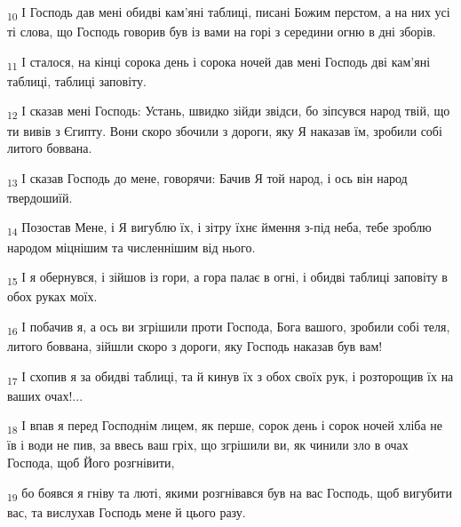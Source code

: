 \begin{tcolorbox}
\textsubscript{10} І Господь дав мені обидві кам'яні таблиці, писані Божим перстом, а на них усі ті слова, що Господь говорив був із вами на горі з середини огню в дні зборів.
\end{tcolorbox}
\begin{tcolorbox}
\textsubscript{11} І сталося, на кінці сорока день і сорока ночей дав мені Господь дві кам'яні таблиці, таблиці заповіту.
\end{tcolorbox}
\begin{tcolorbox}
\textsubscript{12} І сказав мені Господь: Устань, швидко зійди звідси, бо зіпсувся народ твій, що ти вивів з Єгипту. Вони скоро збочили з дороги, яку Я наказав їм, зробили собі литого боввана.
\end{tcolorbox}
\begin{tcolorbox}
\textsubscript{13} І сказав Господь до мене, говорячи: Бачив Я той народ, і ось він народ твердошиїй.
\end{tcolorbox}
\begin{tcolorbox}
\textsubscript{14} Позостав Мене, і Я вигублю їх, і зітру їхнє ймення з-під неба, тебе зроблю народом міцнішим та численнішим від нього.
\end{tcolorbox}
\begin{tcolorbox}
\textsubscript{15} І я обернувся, і зійшов із гори, а гора палає в огні, і обидві таблиці заповіту в обох руках моїх.
\end{tcolorbox}
\begin{tcolorbox}
\textsubscript{16} І побачив я, а ось ви згрішили проти Господа, Бога вашого, зробили собі теля, литого боввана, зійшли скоро з дороги, яку Господь наказав був вам!
\end{tcolorbox}
\begin{tcolorbox}
\textsubscript{17} І схопив я за обидві таблиці, та й кинув їх з обох своїх рук, і розторощив їх на ваших очах!...
\end{tcolorbox}
\begin{tcolorbox}
\textsubscript{18} І впав я перед Господнім лицем, як перше, сорок день і сорок ночей хліба не їв і води не пив, за ввесь ваш гріх, що згрішили ви, як чинили зло в очах Господа, щоб Його розгнівити,
\end{tcolorbox}
\begin{tcolorbox}
\textsubscript{19} бо боявся я гніву та люті, якими розгнівався був на вас Господь, щоб вигубити вас, та вислухав Господь мене й цього разу.
\end{tcolorbox}
